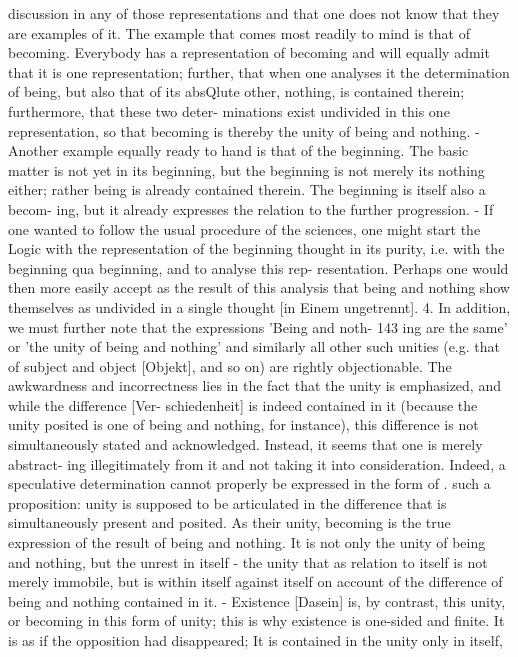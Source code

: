 discussion in any of those representations and that one does not know
that they are examples of it. The example that comes most readily to
mind is that of becoming. Everybody has a representation of becoming
and will equally admit that it is one representation; further, that when
one analyses it the determination of being, but also that of its absQlute
other, nothing, is contained therein; furthermore, that these two deter-
minations exist undivided in this one representation, so that becoming
is thereby the unity of being and nothing. - Another example equally
ready to hand is that of the beginning. The basic matter is not yet in
its beginning, but the beginning is not merely its nothing either; rather
being is already contained therein. The beginning is itself also a becom-
ing, but it already expresses the relation to the further progression. -
If one wanted to follow the usual procedure of the sciences, one might
start the Logic with the representation of the beginning thought in its
purity, i.e. with the beginning qua beginning, and to analyse this rep-
resentation. Perhaps one would then more easily accept as the result of
this analysis that being and nothing show themselves as undivided in a
single thought [in Einem ungetrennt]. 4. In addition, we must further note that the expressions 'Being and noth-
143
ing are the same' or 'the unity of being and nothing' and similarly all
other such unities (e.g. that of subject and object [Objekt], and so on)
are rightly objectionable. The awkwardness and incorrectness lies in
the fact that the unity is emphasized, and while the difference [Ver-
schiedenheit] is indeed contained in it (because the unity posited is one
of being and nothing, for instance), this difference is not simultaneously
stated and acknowledged. Instead, it seems that one is merely abstract-
ing illegitimately from it and not taking it into consideration. Indeed, a
speculative determination cannot properly be expressed in the form of
. such a proposition: unity is supposed to be articulated in the difference
that is simultaneously present and posited. As their unity, becoming is
the true expression of the result of being and nothing. It is not only
the unity of being and nothing, but the unrest in itself - the unity that
as relation to itself is not merely immobile, but is within itself against
itself on account of the difference of being and nothing contained in
it. - Existence [Dasein] is, by contrast, this unity, or becoming in this
form of unity; this is why existence is one-sided and finite. It is as if the
opposition had disappeared; It is contained in the unity only in itself,
